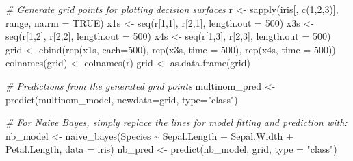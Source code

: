 \documentclass[
]{article}
\newenvironment{Shaded}{\begin{snugshade}}{\end{snugshade}}
\newcommand{\AttributeTok}[1]{\textcolor[rgb]{0.77,0.63,0.00}{#1}}
\newcommand{\CommentTok}[1]{\textcolor[rgb]{0.56,0.35,0.01}{\textit{#1}}}
\newcommand{\ConstantTok}[1]{\textcolor[rgb]{0.00,0.00,0.00}{#1}}
\newcommand{\DecValTok}[1]{\textcolor[rgb]{0.00,0.00,0.81}{#1}}
\newcommand{\FunctionTok}[1]{\textcolor[rgb]{0.00,0.00,0.00}{#1}}
\newcommand{\NormalTok}[1]{#1}
\newcommand{\OtherTok}[1]{\textcolor[rgb]{0.56,0.35,0.01}{#1}}
\newcommand{\SpecialCharTok}[1]{\textcolor[rgb]{0.00,0.00,0.00}{#1}}
\newcommand{\StringTok}[1]{\textcolor[rgb]{0.31,0.60,0.02}{#1}}
\begin{document}
\begin{Shaded}
\begin{Highlighting}[]
\CommentTok{\# Generate grid points for plotting decision surfaces}
\NormalTok{r }\OtherTok{\textless{}{-}} \FunctionTok{sapply}\NormalTok{(iris[, }\FunctionTok{c}\NormalTok{(}\DecValTok{1}\NormalTok{,}\DecValTok{2}\NormalTok{,}\DecValTok{3}\NormalTok{)], range, }\AttributeTok{na.rm =} \ConstantTok{TRUE}\NormalTok{)}
\NormalTok{x1s }\OtherTok{\textless{}{-}} \FunctionTok{seq}\NormalTok{(r[}\DecValTok{1}\NormalTok{,}\DecValTok{1}\NormalTok{], r[}\DecValTok{2}\NormalTok{,}\DecValTok{1}\NormalTok{], }\AttributeTok{length.out =} \DecValTok{500}\NormalTok{)}
\NormalTok{x3s }\OtherTok{\textless{}{-}} \FunctionTok{seq}\NormalTok{(r[}\DecValTok{1}\NormalTok{,}\DecValTok{2}\NormalTok{], r[}\DecValTok{2}\NormalTok{,}\DecValTok{2}\NormalTok{], }\AttributeTok{length.out =} \DecValTok{500}\NormalTok{)}
\NormalTok{x4s }\OtherTok{\textless{}{-}} \FunctionTok{seq}\NormalTok{(r[}\DecValTok{1}\NormalTok{,}\DecValTok{3}\NormalTok{], r[}\DecValTok{2}\NormalTok{,}\DecValTok{3}\NormalTok{], }\AttributeTok{length.out =} \DecValTok{500}\NormalTok{)}
\NormalTok{grid }\OtherTok{\textless{}{-}} \FunctionTok{cbind}\NormalTok{(}\FunctionTok{rep}\NormalTok{(x1s, }\AttributeTok{each=}\DecValTok{500}\NormalTok{), }\FunctionTok{rep}\NormalTok{(x3s, }\AttributeTok{time =} \DecValTok{500}\NormalTok{), }\FunctionTok{rep}\NormalTok{(x4s, }\AttributeTok{time =} \DecValTok{500}\NormalTok{))}
\FunctionTok{colnames}\NormalTok{(grid) }\OtherTok{\textless{}{-}} \FunctionTok{colnames}\NormalTok{(r)}
\NormalTok{grid }\OtherTok{\textless{}{-}} \FunctionTok{as.data.frame}\NormalTok{(grid)}

\CommentTok{\# Predictions from the generated grid points}
\NormalTok{multinom\_pred }\OtherTok{\textless{}{-}} \FunctionTok{predict}\NormalTok{(multinom\_model, }\AttributeTok{newdata=}\NormalTok{grid, }\AttributeTok{type=}\StringTok{"class"}\NormalTok{)}


\CommentTok{\# For Naive Bayes, simply replace the lines for model fitting and prediction with:}
\NormalTok{nb\_model }\OtherTok{\textless{}{-}} \FunctionTok{naive\_bayes}\NormalTok{(Species }\SpecialCharTok{\textasciitilde{}}\NormalTok{ Sepal.Length }\SpecialCharTok{+}\NormalTok{ Sepal.Width }\SpecialCharTok{+}\NormalTok{ Petal.Length, }\AttributeTok{data =}\NormalTok{ iris)}
\NormalTok{nb\_pred }\OtherTok{\textless{}{-}} \FunctionTok{predict}\NormalTok{(nb\_model, grid, }\AttributeTok{type =} \StringTok{"class"}\NormalTok{)}


\end{Highlighting}
\end{Shaded}
\end{document}
